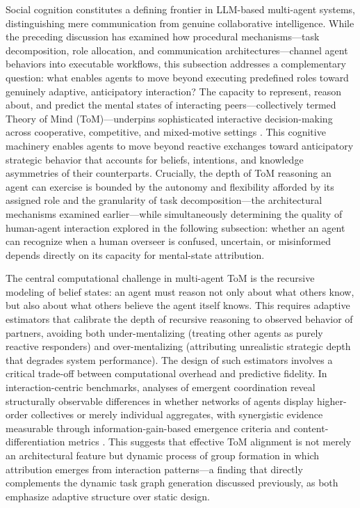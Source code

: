 \documentclass[11pt,a4paper]{article}
\begin{document}
Social cognition constitutes a defining frontier in LLM-based multi-agent systems, distinguishing mere communication from genuine collaborative intelligence. While the preceding discussion has examined how procedural mechanisms---task decomposition, role allocation, and communication architectures---channel agent behaviors into executable workflows, this subsection addresses a complementary question: what enables agents to move beyond executing predefined roles toward genuinely adaptive, anticipatory interaction? The capacity to represent, reason about, and predict the mental states of interacting peers---collectively termed Theory of Mind (ToM)---underpins sophisticated interactive decision-making across cooperative, competitive, and mixed-motive settings \cite{arxiv:2601.10567v1}. This cognitive machinery enables agents to move beyond reactive exchanges toward anticipatory strategic behavior that accounts for beliefs, intentions, and knowledge asymmetries of their counterparts. Crucially, the depth of ToM reasoning an agent can exercise is bounded by the autonomy and flexibility afforded by its assigned role and the granularity of task decomposition---the architectural mechanisms examined earlier---while simultaneously determining the quality of human-agent interaction explored in the following subsection: whether an agent can recognize when a human overseer is confused, uncertain, or misinformed depends directly on its capacity for mental-state attribution.

The central computational challenge in multi-agent ToM is the recursive modeling of belief states: an agent must reason not only about what others know, but also about what others believe the agent itself knows. This requires adaptive estimators that calibrate the depth of recursive reasoning to observed behavior of partners, avoiding both under-mentalizing (treating other agents as purely reactive responders) and over-mentalizing (attributing unrealistic strategic depth that degrades system performance). The design of such estimators involves a critical trade-off between computational overhead and predictive fidelity. In interaction-centric benchmarks, analyses of emergent coordination reveal structurally observable differences in whether networks of agents display higher-order collectives or merely individual aggregates, with synergistic evidence measurable through information-gain-based emergence criteria and content-differentiation metrics \cite{arxiv:2510.05174v4}. This suggests that effective ToM alignment is not merely an architectural feature but dynamic process of group formation in which attribution emerges from interaction patterns---a finding that directly complements the dynamic task graph generation discussed previously, as both emphasize adaptive structure over static design.
\end{document}
